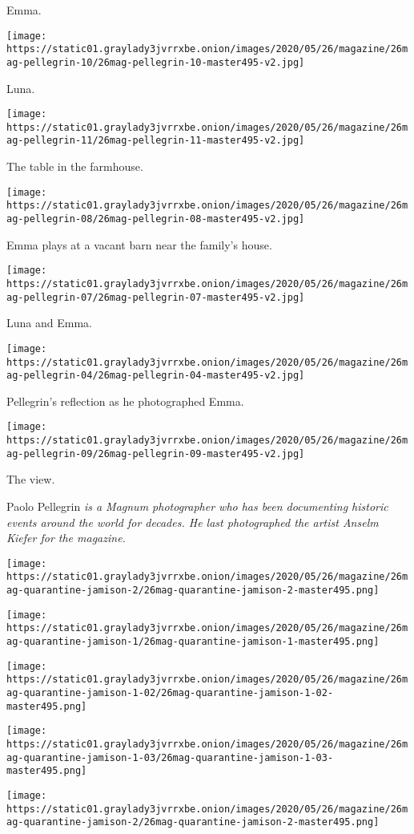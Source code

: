 Emma.

\texttt{[image: https://static01.graylady3jvrrxbe.onion/images/2020/05/26/magazine/26mag-pellegrin-10/26mag-pellegrin-10-master495-v2.jpg]}

Luna.

\texttt{[image: https://static01.graylady3jvrrxbe.onion/images/2020/05/26/magazine/26mag-pellegrin-11/26mag-pellegrin-11-master495-v2.jpg]}

The table in the farmhouse.

\texttt{[image: https://static01.graylady3jvrrxbe.onion/images/2020/05/26/magazine/26mag-pellegrin-08/26mag-pellegrin-08-master495-v2.jpg]}

Emma plays at a vacant barn near the family's house.

\texttt{[image: https://static01.graylady3jvrrxbe.onion/images/2020/05/26/magazine/26mag-pellegrin-07/26mag-pellegrin-07-master495-v2.jpg]}

Luna and Emma.

\texttt{[image: https://static01.graylady3jvrrxbe.onion/images/2020/05/26/magazine/26mag-pellegrin-04/26mag-pellegrin-04-master495-v2.jpg]}

Pellegrin's reflection as he photographed Emma.

\texttt{[image: https://static01.graylady3jvrrxbe.onion/images/2020/05/26/magazine/26mag-pellegrin-09/26mag-pellegrin-09-master495-v2.jpg]}

The view.

Paolo Pellegrin \emph{is a Magnum photographer who has been documenting
historic events around the world for decades. He last photographed the
artist Anselm Kiefer for the magazine.}

\texttt{[image: https://static01.graylady3jvrrxbe.onion/images/2020/05/26/magazine/26mag-quarantine-jamison-2/26mag-quarantine-jamison-2-master495.png]}

\texttt{[image: https://static01.graylady3jvrrxbe.onion/images/2020/05/26/magazine/26mag-quarantine-jamison-1/26mag-quarantine-jamison-1-master495.png]}

\texttt{[image: https://static01.graylady3jvrrxbe.onion/images/2020/05/26/magazine/26mag-quarantine-jamison-1-02/26mag-quarantine-jamison-1-02-master495.png]}

\texttt{[image: https://static01.graylady3jvrrxbe.onion/images/2020/05/26/magazine/26mag-quarantine-jamison-1-03/26mag-quarantine-jamison-1-03-master495.png]}

\texttt{[image: https://static01.graylady3jvrrxbe.onion/images/2020/05/26/magazine/26mag-quarantine-jamison-2/26mag-quarantine-jamison-2-master495.png]}

